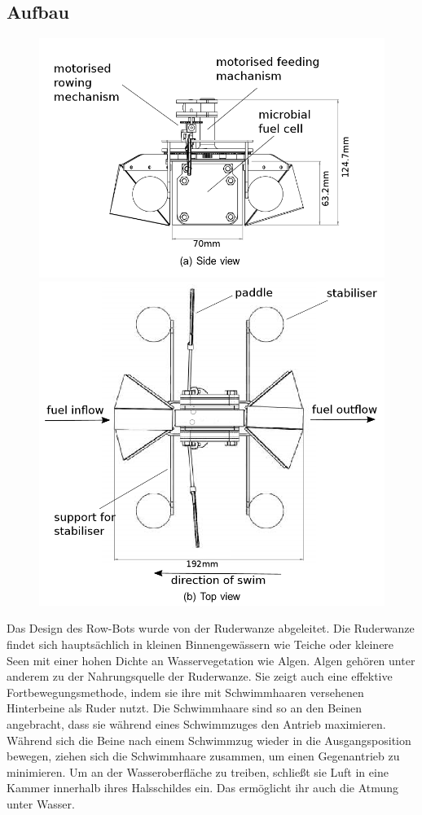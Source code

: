 \documentclass{SeminarV2}
\begin{document}
\subsection{Aufbau}\label{sec:design}
\begin{figure}[ht]
  \includegraphics[width=\linewidth]{pics/front}
\endminipage\hfill
{}
  \includegraphics[width=0.7\linewidth]{pics/top}
\endminipage\hfill
{}
\end{figure}
Das Design des Row-Bots wurde von der Ruderwanze abgeleitet. Die Ruderwanze findet sich hauptsächlich in kleinen Binnengewässern wie Teiche oder kleinere Seen mit einer hohen Dichte an Wasservegetation wie Algen. Algen gehören unter anderem zu der Nahrungsquelle der Ruderwanze. Sie zeigt auch eine effektive Fortbewegungsmethode, indem sie ihre mit Schwimmhaaren versehenen Hinterbeine als Ruder nutzt. Die Schwimmhaare sind so an den Beinen angebracht, dass sie während eines Schwimmzuges den Antrieb maximieren. Während sich die Beine nach einem Schwimmzug wieder in die Ausgangsposition bewegen, ziehen sich die Schwimmhaare zusammen, um einen Gegenantrieb zu minimieren.\cite[S. 3891]{DBLP:conf/iros/PhilamoreRSI15} Um an der Wasseroberfläche zu treiben, schließt sie Luft in eine Kammer innerhalb ihres Halsschildes ein. Das ermöglicht ihr auch die Atmung unter Wasser.\cite{ruderwanze} 
\end{document}
